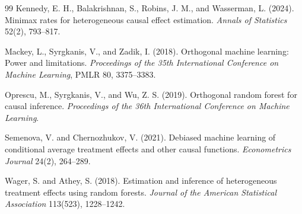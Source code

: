 \documentclass[11pt]{article}
\theoremstyle{definition}
\theoremstyle{plain}
\theoremstyle{remark}
\begin{document}
\begin{thebibliography}{99}
Kennedy, E. H., Balakrishnan, S., Robins, J. M., and Wasserman, L. (2024).
\newblock Minimax rates for heterogeneous causal effect estimation.
\newblock \emph{Annals of Statistics} 52(2), 793--817.

Mackey, L., Syrgkanis, V., and Zadik, I. (2018).
\newblock Orthogonal machine learning: Power and limitations.
\newblock \emph{Proceedings of the 35th International Conference on Machine Learning}, PMLR 80, 3375--3383.

Oprescu, M., Syrgkanis, V., and Wu, Z. S. (2019).
\newblock Orthogonal random forest for causal inference.
\newblock \emph{Proceedings of the 36th International Conference on Machine Learning}.

Semenova, V. and Chernozhukov, V. (2021).
\newblock Debiased machine learning of conditional average treatment effects and other causal functions.
\newblock \emph{Econometrics Journal} 24(2), 264--289.

Wager, S. and Athey, S. (2018).
\newblock Estimation and inference of heterogeneous treatment effects using random forests.
\newblock \emph{Journal of the American Statistical Association} 113(523), 1228--1242.
\end{thebibliography}
\end{document}
